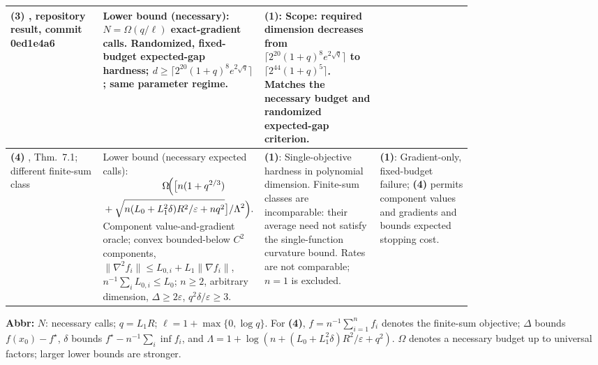 \begin{table}[tp]
\begin{threeparttable}
\begin{tabularx}{\linewidth}{@{}>{\raggedright\arraybackslash}p{0.20\linewidth}>{\raggedright\arraybackslash}p{0.32\linewidth}>{\raggedright\arraybackslash}p{0.25\linewidth}>{\raggedright\arraybackslash}X@{}}
\midrule
\textbf{(3)} \citep{polynomialPriorRepository166}, repository result, commit 0ed1e4a6
& Lower bound (necessary): $N=\Omega(q/\ell)$ exact-gradient calls. Randomized, fixed-budget expected-gap hardness; $d\ge\lceil2^{20}(1+q)^8e^{2\sqrt q}\rceil$; same parameter regime.
& \textbf{(1)}: Scope: required dimension decreases from $\lceil2^{20}(1+q)^8e^{2\sqrt q}\rceil$ to $\lceil2^{44}(1+q)^5\rceil$. Matches the necessary budget and randomized expected-gap criterion.
& \\
\midrule
\textbf{(4)} \citep{polynomialEverestIIV2}, Thm.~7.1; different finite-sum class
& Lower bound (necessary expected calls):
$\begin{aligned}
\Omega\!\Bigl(\bigl[n(1+q^{2/3})&{}\\
{}+\sqrt{n(L_0+L_1^2\delta)R^2/\varepsilon+nq^2}&\bigr]/\Lambda^2\Bigr).
\end{aligned}$
Component value-and-gradient oracle; convex bounded-below $C^2$ components, $\|\nabla^2f_i\|\le L_{0,i}+L_1\|\nabla f_i\|$, $n^{-1}\sum_i L_{0,i}\le L_0$; $n\ge2$, arbitrary dimension, $\Delta\ge2\varepsilon$, $q^2\delta/\varepsilon\ge3$.
& \textbf{(1)}: Single-objective hardness in polynomial dimension. Finite-sum classes are incomparable: their average need not satisfy the single-function curvature bound. Rates are not comparable; $n=1$ is excluded.
& \textbf{(1)}: Gradient-only, fixed-budget failure; \textbf{(4)} permits component values and gradients and bounds expected stopping cost. \\
\bottomrule
\end{tabularx}
\begin{tablenotes}[flushleft]\footnotesize
\item[] \textbf{Abbr:} $N$: necessary calls; $q=L_1R$; $\ell=1+\max\{0,\log q\}$. For \textbf{(4)}, $f=n^{-1}\sum_{i=1}^n f_i$ denotes the finite-sum objective; $\Delta$ bounds $f(x_0)-f^\star$, $\delta$ bounds $f^\star-n^{-1}\sum_i\inf f_i$, and $\Lambda=1+\log\!\left(n+(L_0+L_1^2\delta)R^2/\varepsilon+q^2\right)$. $\Omega$ denotes a necessary budget up to universal factors; larger lower bounds are stronger.
\end{tablenotes}
\end{threeparttable}
\end{table}
\clearpage

